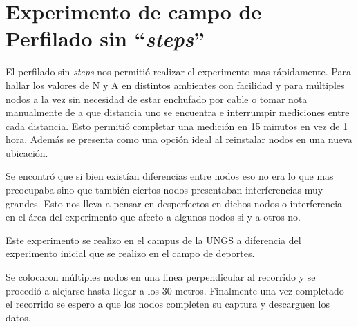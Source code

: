 \section{Experimento de campo de Perfilado sin \textbf{“\textit{steps}”} }

El perfilado sin \textit{steps} nos permitió realizar el experimento mas rápidamente. Para hallar los valores de N y A en distintos ambientes con facilidad y para múltiples nodos a la vez sin necesidad de estar enchufado por cable o tomar nota manualmente de a que distancia uno se encuentra e interrumpir mediciones entre cada distancia. Esto permitió completar una medición en 15 minutos en vez de 1 hora. Además se presenta como una opción ideal al reinstalar nodos en una nueva ubicación.

Se encontró que si bien existían diferencias entre nodos eso no era lo que mas preocupaba sino que también ciertos nodos presentaban interferencias muy grandes. Esto nos lleva a pensar en desperfectos en dichos nodos o interferencia en el área del experimento que afecto a algunos nodos si y a otros no.

Este experimento se realizo en el campus de la UNGS a diferencia del experimento inicial que se realizo en el campo de deportes.

Se colocaron múltiples nodos en una linea perpendicular al recorrido y se procedió a alejarse hasta llegar a los 30 metros. Finalmente una vez completado el recorrido se espero a que los nodos completen su captura y descarguen los datos. 





